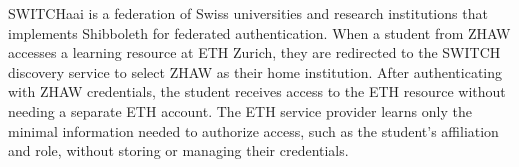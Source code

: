 \begin{example}
SWITCHaai is a federation of Swiss universities and research institutions that implements Shibboleth for federated authentication. When a student from ZHAW accesses a learning resource at ETH Zurich, they are redirected to the SWITCH discovery service to select ZHAW as their home institution. After authenticating with ZHAW credentials, the student receives access to the ETH resource without needing a separate ETH account. The ETH service provider learns only the minimal information needed to authorize access, such as the student's affiliation and role, without storing or managing their credentials.
\end{example}